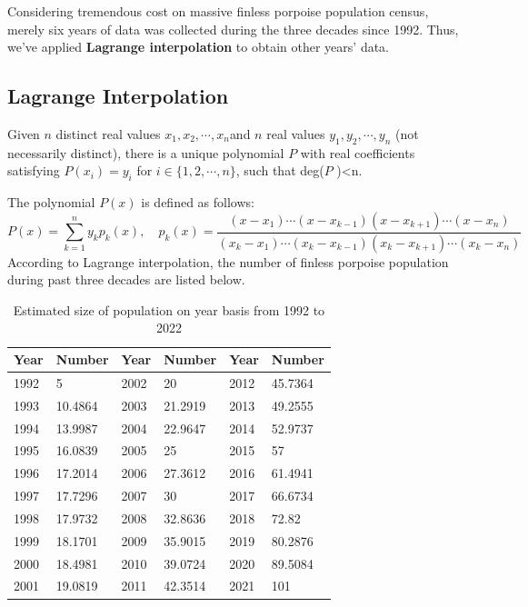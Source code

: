 \documentclass{mcmthesis}
\numberwithin{figure}{section}
\numberwithin{table}{section}
\numberwithin{equation}{section}
\begin{document}
Considering tremendous cost on massive finless porpoise population 
census, merely six years of data was collected during the three 
decades since 1992. \citep{Liuzhigang}
Thus, we've applied \textbf{Lagrange interpolation} to obtain other years' data.

\subsection{Lagrange Interpolation}
Given $ n $ distinct real values $ x_1, x_2, \cdots , x_n $and $ n $
real values $ y_1, y_2,\cdots, y_n $ (not necessarily distinct), there
is a unique polynomial $ P $ with real coefficients satisfying 
$ P(x_i)= y_i $ for $ i \in \{1,2,\cdots,n\} $, such that deg($ P $ )<n.
\par
The polynomial $ P(x) $ is defined as follows:   
$$
  P(x) = \sum \limits _{k = 1}^ny_kp_k(x),\quad
  p_k(x) = \frac{(x-x_1)\cdots (x-x_{k-1})(x-x_{k+1})\cdots (x-x_n)}{
    (x_k-x_1)\cdots (x_k-x_{k-1})(x_k-x_{k+1})\cdots (x_k-x_n)
  }
$$
According to Lagrange interpolation, the number of finless porpoise population 
during past three decades are listed below.
\begin{table}[htpb!]
  \centering
  \caption{Estimated size of population on year basis from 1992 to 2022} \label{Lagrange table}
  \begin{tabular}{m{2cm}<{\centering}|m{2cm}<{\centering}|m{2cm}<{\centering}|m{2cm}<{\centering}|m{2cm}<{\centering}|m{2cm}<{\centering}}
  \rowcolor{darkOrange}  \textbf{Year}&\textbf{Number}&\textbf{Year}&\textbf{Number}&\textbf{Year}&\textbf{Number}\\ \hline
  \rowcolor{Orange}  1992 & 5       & 2002 & 20      & 2012 & 45.7364 \\
  \rowcolor{lightOrange}  1993 & 10.4864 & 2003 & 21.2919 & 2013 & 49.2555 \\
  \rowcolor{Orange}  1994 & 13.9987 & 2004 & 22.9647 & 2014 & 52.9737 \\
  \rowcolor{lightOrange}  1995 & 16.0839 & 2005 & 25      & 2015 & 57      \\
  \rowcolor{Orange}  1996 & 17.2014 & 2006 & 27.3612 & 2016 & 61.4941 \\
  \rowcolor{lightOrange}  1997 & 17.7296 & 2007 & 30      & 2017 & 66.6734 \\
  \rowcolor{Orange}  1998 & 17.9732 & 2008 & 32.8636 & 2018 & 72.82   \\
  \rowcolor{lightOrange}  1999 & 18.1701 & 2009 & 35.9015 & 2019 & 80.2876 \\
  \rowcolor{Orange}  2000 & 18.4981 & 2010 & 39.0724 & 2020 & 89.5084 \\
  \rowcolor{lightOrange}  2001 & 19.0819 & 2011 & 42.3514 & 2021 & 101     \\
  \end{tabular}
\end{table}
\end{document}
